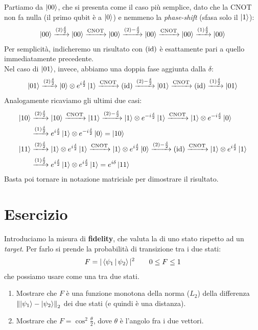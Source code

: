\documentclass[../../InformazioneQuantistica.tex]{subfiles}
\begin{document}
Partiamo da $\Ket{00}$, che si presenta come il caso più semplice, dato che la CNOT non fa nulla (il primo qubit è a $\Ket{0}$) e nemmeno la \textit{phase-shift} (sfasa solo il $\Ket{1}$):
\begin{align*}
\Ket{00}\xrightarrow{(2)\frac{\delta}{2}}\Ket{00}\xrightarrow{\operatorname{CNOT}} \Ket{00}\xrightarrow{(2)-\frac{\delta}{2}}\Ket{00}\xrightarrow{\operatorname{CNOT}} \Ket{00} \xrightarrow{(1)\frac{\delta}{2}}\Ket{00}
\end{align*}
Per semplicità, indicheremo un risultato con $(\operatorname{id})$ è esattamente pari a quello immediatamente precedente.\\
Nel caso di $\Ket{01}$, invece, abbiamo una doppia fase aggiunta dalla $\delta$:
\begin{align*}
\Ket{01} \xrightarrow{(2)\frac{\delta}{2}} \Ket{0}\otimes e^{i\frac{\delta}{2}}\Ket{1} \xrightarrow{\operatorname{CNOT}} (\operatorname{id})\xrightarrow{(2)-\frac{\delta}{2}} \Ket{01}\xrightarrow{\operatorname{CNOT}}(\operatorname{id})  \xrightarrow{(1)\frac{\delta}{2}}
\Ket{01}
\end{align*}
Analogamente ricaviamo gli ultimi due casi:
\begin{align*}
\Ket{10}&\xrightarrow{(2)\frac{\delta}{2}} \Ket{10} \xrightarrow{\operatorname{CNOT}}\Ket{11}
\xrightarrow{(2)-\frac{\delta}{2}} \Ket{1}\otimes e^{-i\frac{\delta}{2}}\Ket{1}\xrightarrow{\operatorname{CNOT}} \Ket{1}\otimes e^{-i\frac{\delta}{2}}\Ket{0}\\
&\xrightarrow{(1)\frac{\delta}{2}} e^{i\frac{\delta}{2}}\Ket{1}\otimes e^{-i\frac{\delta}{2}}\Ket{0}=\Ket{10}\\
\Ket{11}&\xrightarrow{(2)\frac{\delta}{2}} \Ket{1}\otimes e^{i\frac{\delta}{2}}\Ket{1} \xrightarrow{\operatorname{CNOT}} \Ket{1}\otimes e^{i\frac{\delta}{2}}\Ket{0} \xrightarrow{(2)-\frac{\delta}{2}} (\operatorname{id}) \xrightarrow{\operatorname{CNOT}}\Ket{1}\otimes e^{i\frac{\delta}{2}}\Ket{1}\\
&\xrightarrow{(1)\frac{\delta}{2}} e^{i\frac{\delta}{2}}\Ket{1}\otimes e^{i\frac{\delta}{2}}\Ket{1}=e^{i\delta}\Ket{11}
\end{align*}
Basta poi tornare in notazione matriciale per dimostrare il risultato.

\section{Esercizio \theEsercizio}
Introduciamo la misura di \textbf{fidelity}, che valuta la  di uno stato rispetto ad un \textit{target}. Per farlo si prende la probabilità di transizione tra i due stati:
\begin{align*}
F=|\Braket{\psi_1|\psi_2}|^2 \qquad 0\leq F \leq 1
\end{align*}
che possiamo usare come una  tra due stati.
\begin{enumerate}
\item Mostrare che $F$ è una funzione monotona della norma ($L_2$) della differenza $\left\lVert\Ket{\psi_1}-\Ket{\psi_2}\right\rVert_2$ dei due stati (e quindi è una distanza).
\item Mostrare che $F= \cos^2\frac{\theta}{2}$, dove $\theta$ è l'angolo fra i due vettori.
\end{enumerate}
\end{document}
